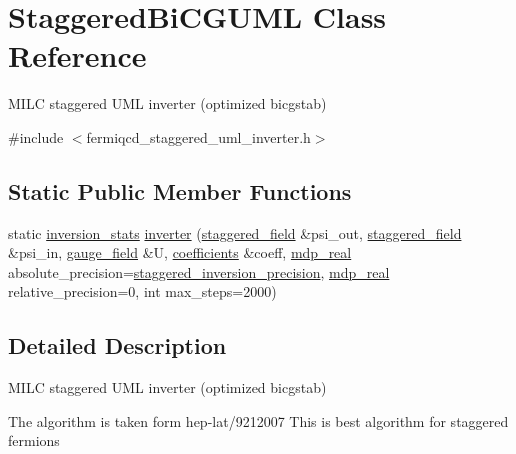 \hypertarget{class_staggered_bi_c_g_u_m_l}{}\section{Staggered\+Bi\+C\+G\+U\+ML Class Reference}
\label{class_staggered_bi_c_g_u_m_l}


M\+I\+LC staggered U\+ML inverter (optimized bicgstab)  




{\ttfamily \#include $<$fermiqcd\+\_\+staggered\+\_\+uml\+\_\+inverter.\+h$>$}

\subsection*{Static Public Member Functions}
\begin{DoxyCompactItemize}
\item 
static \hyperlink{classinversion__stats}{inversion\+\_\+stats} \hyperlink{class_staggered_bi_c_g_u_m_l_ac1959ada50857a518ad4c9d82fead805}{inverter} (\hyperlink{classstaggered__field}{staggered\+\_\+field} \&psi\+\_\+out, \hyperlink{classstaggered__field}{staggered\+\_\+field} \&psi\+\_\+in, \hyperlink{classgauge__field}{gauge\+\_\+field} \&U, \hyperlink{classcoefficients}{coefficients} \&coeff, \hyperlink{mdp__global__vars_8h_a69d96b74c791e0bbdb888b3913a69450}{mdp\+\_\+real} absolute\+\_\+precision=\hyperlink{fermiqcd__default__parameters_8h_ace2adee73e3f9d7c0df3759732b2688b}{staggered\+\_\+inversion\+\_\+precision}, \hyperlink{mdp__global__vars_8h_a69d96b74c791e0bbdb888b3913a69450}{mdp\+\_\+real} relative\+\_\+precision=0, int max\+\_\+steps=2000)
\end{DoxyCompactItemize}


\subsection{Detailed Description}
M\+I\+LC staggered U\+ML inverter (optimized bicgstab) 

The algorithm is taken form hep-\/lat/9212007 This is best algorithm for staggered fermions

